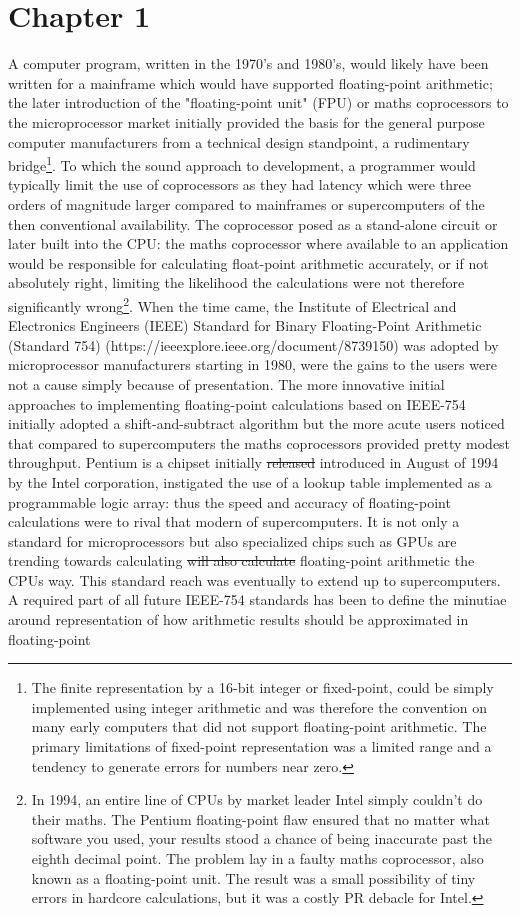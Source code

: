 \documentclass[7pt]{article}
\begin{document}
	
	\section*{Chapter 1}

A computer program, written in the 1970's and 1980's, would likely have been written for a mainframe which would have supported floating-point arithmetic; the later introduction of the "floating-point unit" (FPU) or maths coprocessors to the microprocessor market initially provided the basis for the general purpose computer manufacturers from a technical design standpoint, a rudimentary bridge\footnote{The finite representation by a 16-bit integer or fixed-point, could be simply implemented using integer arithmetic and was therefore the convention on many early computers that did not support floating-point arithmetic. The primary limitations of fixed-point representation was a limited range and a tendency to generate errors for numbers near zero.}. To which the sound approach to development, a programmer would typically limit the use of coprocessors as they had latency which were three orders of magnitude larger compared to mainframes or supercomputers of the then conventional availability. The coprocessor posed as a stand-alone circuit or later built into the CPU: the maths coprocessor where available to an application would be responsible for calculating float-point arithmetic accurately, or if not absolutely right, limiting the likelihood the calculations were not therefore significantly wrong\footnote{In 1994, an entire line of CPUs by market leader Intel simply couldn't do their maths. The Pentium floating-point flaw ensured that no matter what software you used, your results stood a chance of being inaccurate past the eighth decimal point. The problem lay in a faulty maths coprocessor, also known as a floating-point unit. The result was a small possibility of tiny errors in hardcore calculations, but it was a costly PR debacle for Intel.}.  When the time came, the Institute of Electrical and Electronics Engineers (IEEE) Standard for Binary Floating-Point Arithmetic (Standard 754) (https://ieeexplore.ieee.org/document/8739150) was adopted by microprocessor manufacturers starting in 1980, were the gains to the users were not a cause simply because of presentation. The more innovative initial approaches to implementing floating-point calculations based on IEEE-754 initially adopted a shift-and-subtract algorithm but the more acute users noticed that compared to supercomputers the maths coprocessors provided pretty modest throughput. Pentium is a chipset initially \st{released} introduced in August of 1994 by the Intel corporation, instigated the use of a lookup table implemented as a programmable logic array: thus the speed and accuracy of floating-point calculations were to rival that modern of supercomputers. It is not only a standard for microprocessors but also specialized chips such as GPUs are trending towards calculating \st{will also calculate} floating-point arithmetic the CPUs way. This standard reach was eventually to extend up to supercomputers. A required part of all future IEEE-754 standards has been to define the minutiae around representation of how arithmetic results should be approximated in floating-point 
\end{document}
